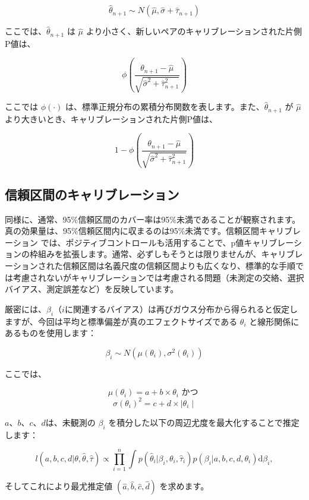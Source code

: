 \documentclass[
  11pt]{book}
\theoremstyle{definition}
\theoremstyle{definition}
\theoremstyle{definition}
\theoremstyle{definition}
\theoremstyle{remark}
\begin{document}
\[\hat{\theta}_{n+1} \sim N(\hat{\mu}, \hat{\sigma} + \hat{\tau}_{n+1})\]

ここでは、\(\hat{\theta}_{n+1}\) は \(\hat{\mu}\) より小さく、新しいペアのキャリブレーションされた片側P値は、

\[\phi\left(\frac{\theta_{n+1} - \hat{\mu}}{\sqrt{\hat{\sigma}^2 + \hat{\tau}_{n+1}^2}}\right)\]

ここでは \(\phi(\cdot)\) は、標準正規分布の累積分布関数を表します。また、\(\hat{\theta}_{n+1}\) が \(\hat{\mu}\) より大きいとき、キャリブレーションされた片側P値は、

\[1-\phi\left(\frac{\theta_{n+1} - \hat{\mu}}{\sqrt{\hat{\sigma}^2 + \hat{\tau}_{n+1}^2}}\right)\]

\subsection{信頼区間のキャリブレーション}\label{ux4fe1ux983cux533aux9593ux306eux30adux30e3ux30eaux30d6ux30ecux30fcux30b7ux30e7ux30f3}


同様に、通常、95\%信頼区間のカバー率は95\%未満であることが観察されます。真の効果量は、95\%信頼区間内に収まるのは95\%未満です。信頼区間キャリブレーション \citep{schuemie_2018} では、ポジティブコントロールも活用することで、p値キャリブレーションの枠組みを拡張します。通常、必ずしもそうとは限りませんが、キャリブレーションされた信頼区間は名義尺度の信頼区間よりも広くなり、標準的な手順では考慮されないがキャリブレーションでは考慮される問題（未測定の交絡、選択バイアス、測定誤差など）を反映しています。

厳密には、\(\beta_i\)（\(i\)に関連するバイアス）は再びガウス分布から得られると仮定しますが、今回は平均と標準偏差が真のエフェクトサイズである \(\theta_i\) と線形関係にあるものを使用します：

\[\beta_i \sim N(\mu(\theta_i) , \sigma^2(\theta_i))\]

ここでは、

\[\mu(\theta_i) = a + b \times \theta_i \text{ かつ }\] \[\sigma(\theta_i) ^2= c + d \times \mid \theta_i \mid\]

\(a\)、\(b\)、\(c\)、\(d\)は、未観測の \(\beta_i\) を積分した以下の周辺尤度を最大化することで推定します：

\[l(a,b,c,d | \theta, \hat{\theta}, \hat{\tau} ) \propto \prod_{i=1}^{n}\int p(\hat{\theta}_i|\beta_i, \theta_i, \hat{\tau}_i)p(\beta_i|a,b,c,d,\theta_i) \text{d}\beta_i ,\]

そしてこれにより最尤推定値 \((\hat{a}, \hat{b}, \hat{c}, \hat{d})\) を求めます。
\end{document}
